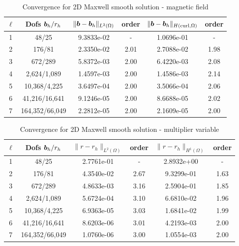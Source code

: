 \begin{table}[h!]
\begin{center}
\begin{tabular}{cccccc}
\hline
$\ell$ &    Dofs $\boldsymbol b_h/r_h$ & $\|\boldsymbol b-\boldsymbol b_h\|_{L^2(\Omega)}$ & order & $\|\boldsymbol b-\boldsymbol b_h\|_{H({\rm curl},\Omega)}$ & order \\
\hline
1 &      48/25 &  9.3833e-02 &    - &  1.0696e-01 &       - \\
2 &     176/81 &  2.3350e-02 &    2.01 &  2.7088e-02 &       1.98 \\
3 &     672/289 &  5.8372e-03 &    2.00 &  6.4220e-03 &       2.08 \\
4 &    2,624/1,089 &  1.4597e-03 &    2.00 &  1.4586e-03 &       2.14 \\
5 &   10,368/4,225 &  3.6497e-04 &    2.00 &  3.5066e-04 &       2.06 \\
6 &   41,216/16,641 &  9.1246e-05 &    2.00 &  8.6688e-05 &       2.02 \\
7 &  164,352/66,049 &  2.2812e-05 &    2.00 &  2.1609e-05 &       2.00 \\
\hline
\end{tabular}
\caption{Convergence for 2D Maxwell smooth solution - magnetic field}
\label{tab:2D_maxwell_magnetic}
\end{center}
\end{table}
\begin{table}[h!]
\begin{center}
\begin{tabular}{cccccc}
\hline
$\ell$ &    Dofs $\boldsymbol b_h/r_h$ & $\|{r}-{r}_h\|_{L^2(\Omega)}$ & order & $\|{r}-{r}_h\|_{H^1(\Omega)}$ & order\\
\hline
 1 &      48/25 &  2.7761e-01 &    - &  2.8932e+00 &     - \\
 2 &     176/81 &  4.3540e-02 &    2.67 &  9.3299e-01 &     1.63 \\
 3 &     672/289 &  4.8633e-03 &    3.16 &  2.5904e-01 &     1.85 \\
 4 &    2,624/1,089 &  5.6724e-04 &    3.10 &  6.6810e-02 &     1.96 \\
 5 &   10,368/4,225 &  6.9363e-05 &    3.03 &  1.6841e-02 &     1.99 \\
 6 &   41,216/16,641 &  8.6203e-06 &    3.01 &  4.2193e-03 &     2.00 \\
 7 &  164,352/66,049 &  1.0760e-06 &    3.00 &  1.0554e-03 &     2.00 \\

\hline
\end{tabular}
\caption{Convergence for 2D Maxwell smooth solution - multiplier variable}
\label{tab:2D_maxwell_multiplier}

\end{center}
\end{table}

